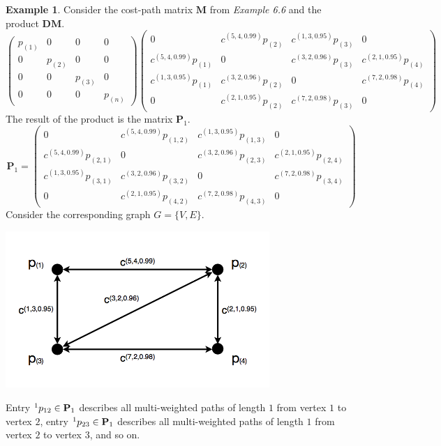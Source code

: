 \documentclass[12pt]{amsart}
\theoremstyle{definition}
\newtheorem{example}[thm]{Example}
\theoremstyle{remark}
\numberwithin{equation}{section}
\begin{document}
\begin{example}
Consider the cost-path matrix $\mathbf{M}$ from \textit{Example 6.6} and the product $\mathbf{D}\mathbf{M}$.
$$
\begin{pmatrix}
p_{(1)} & 0 & 0 & 0 \\
0 & p_{(2)} & 0 & 0 \\
0 & 0 & p_{(3)} & 0 \\
0 & 0 & 0 & p_{(n)} \end{pmatrix} \begin{pmatrix}
0 & c^{(5,4,0.99)} p_{(2)} & c^{(1,3,0.95)} p_{(3)} & 0 \\
c^{(5,4,0.99)} p_{(1)} & 0 & c^{(3,2,0.96)} p_{(3)} & c^{(2,1,0.95)} p_{(4)} \\
c^{(1,3,0.95)} p_{(1)} & c^{(3,2,0.96)} p_{(2)} & 0 & c^{(7,2,0.98)} p_{(4)} \\
0 & c^{(2,1,0.95)} p_{(2)} & c^{(7,2,0.98)} p_{(3)} & 0 \end{pmatrix}
$$
The result of the product is the matrix $\mathbf{P}_1$.
$$
\mathbf{P}_1 = \begin{pmatrix}
0 & c^{(5,4,0.99)} p_{(1,2)} & c^{(1,3,0.95)} p_{(1,3)} & 0 \\
c^{(5,4,0.99)} p_{(2,1)} & 0 & c^{(3,2,0.96)} p_{(2,3)} & c^{(2,1,0.95)} p_{(2,4)} \\
c^{(1,3,0.95)} p_{(3,1)} & c^{(3,2,0.96)} p_{(3,2)} & 0 & c^{(7,2,0.98)} p_{(3,4)} \\
0 & c^{(2,1,0.95)} p_{(4,2)} & c^{(7,2,0.98)} p_{(4,3)} & 0 \end{pmatrix}
$$
Consider the corresponding graph $G = \{V,E\}$.

\begin{center}\includegraphics[width=10cm]{figure-8-plus.png}\end{center}

\noindent Entry $\prescript{1}{}{p_{12}} \in \mathbf{P}_1$ describes all multi-weighted paths of length $1$ from vertex $1$ to vertex $2$, entry $\prescript{1}{}{p_{23}} \in \mathbf{P}_1$ describes all multi-weighted paths of length $1$ from vertex $2$ to vertex $3$, and so on.
\end{example}
\end{document}
